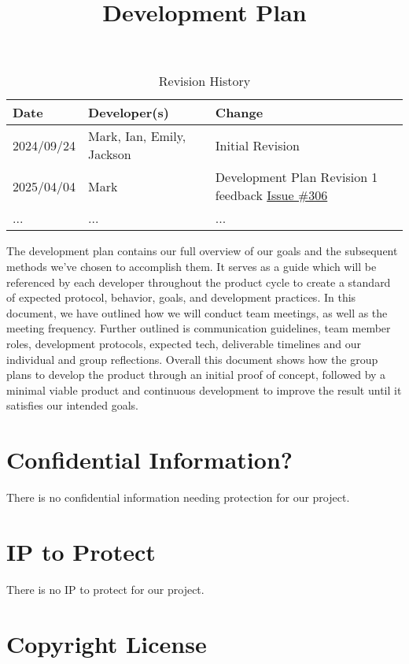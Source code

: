\documentclass{article}
\title{Development Plan\\\progname}
\author{\authname}
\date{}
\begin{document}
\maketitle

\begin{table}[hp]
\caption{Revision History} \label{TblRevisionHistory}
\begin{tabularx}{\textwidth}{llX}
\toprule
\textbf{Date} & \textbf{Developer(s)} & \textbf{Change}\\
\midrule
2024/09/24 & Mark, Ian, Emily, Jackson & Initial Revision\\
2025/04/04 & Mark & Development Plan Revision 1 feedback \href{https://github.com/emilyperica/ScoreGen/issues/306}{Issue \#306}\\
... & ... & ...\\
\bottomrule
\end{tabularx}
\end{table}

\newpage{}

The development plan contains our full overview of our goals and the subsequent methods we’ve chosen to accomplish them. 
It serves as a guide which will be referenced by each developer throughout the product cycle to create a standard of expected protocol, behavior, goals, and development practices. 
In this document, we have outlined how we will conduct team meetings, as well as the meeting frequency. Further outlined is communication guidelines, team member roles, development protocols, expected tech, deliverable timelines and our individual and group reflections. 
Overall this document shows how the group plans to develop the product through an initial proof of concept, followed by a minimal viable product and continuous development to improve the result until it satisfies our intended goals.

\section{Confidential Information?}

There is no confidential information needing protection for our project.

\section{IP to Protect}

There is no IP to protect for our project.

\section{Copyright License}
\end{document}
